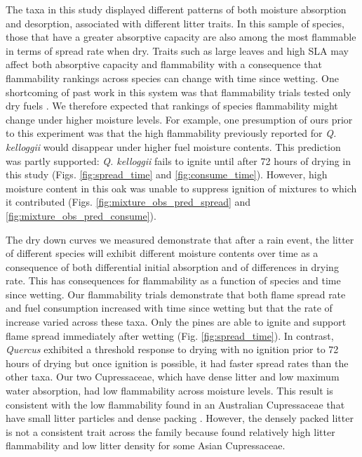 \documentclass[letterpaper,12pt]{article}
\begin{document}
The taxa in this study displayed different patterns of both moisture absorption
and desorption, associated with different litter traits. In this sample of
species, those that have a greater absorptive capacity are also among the most
flammable in terms of spread rate when dry. Traits such as large leaves and
high SLA may affect both absorptive capacity and flammability with a
consequence that flammability rankings across species can change with time
since wetting. One shortcoming of past work in this system was that
flammability trials tested only dry fuels \citep{Magalhaes+Schwilk-2012}. We
therefore expected that rankings of species flammability might change under
higher moisture levels. For example, one presumption of ours prior to this
experiment was that the high flammability previously reported for \emph{Q.
  kelloggii} \citep{Magalhaes+Schwilk-2012} would disappear under higher fuel
moisture contents. This prediction was partly supported: \emph{Q. kelloggii}
fails to ignite until after 72 hours of drying in this study (Figs.
\ref{fig:spread_time} and \ref{fig:consume_time}). However, high moisture
content in this oak was unable to suppress ignition of mixtures to which it
contributed (Figs. \ref{fig:mixture_obs_pred_spread} and
\ref{fig:mixture_obs_pred_consume}).

The dry down curves we measured demonstrate that after a rain event, the litter
of different species will exhibit different moisture contents over time as a
consequence of both differential initial absorption and of differences in
drying rate. This has consequences for flammability as a function of species
and time since wetting. Our flammability trials demonstrate that both flame
spread rate and fuel consumption increased with time since wetting but that the
rate of increase varied across these taxa. Only the pines are able to ignite
and support flame spread immediately after wetting (Fig.
\ref{fig:spread_time}). In contrast, \emph{Quercus} exhibited a threshold
response to drying with no ignition prior to 72 hours of drying but once
ignition is possible, it had faster spread rates than the other taxa. Our two 
Cupressaceae, which have dense litter and low maximum water
absorption, had low flammability across moisture levels. This result is
consistent with the low flammability found in an Australian Cupressaceae that
have small litter particles and dense packing \citep{Scarff+Westoby-2006,
  Bowman+Haverkamp+etal-2018}. However, the densely packed litter is not a
consistent trait across the family because \citet{Cornwell+Elvira+etal-2015}
found relatively high litter flammability and low litter density for some Asian
Cupressaceae.
\end{document}
